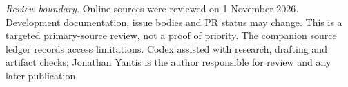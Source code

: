 \documentclass[10pt,letterpaper]{article}
\begin{document}
\smallskip
\noindent\textit{Review boundary.} Online sources were reviewed on 1 November 2026. Development documentation, issue bodies and PR status may change. This is a targeted primary-source review, not a proof of priority. The companion source ledger records access limitations. Codex assisted with research, drafting and artifact checks; Jonathan Yantis is the author responsible for review and any later publication.
\endgroup
\end{document}
